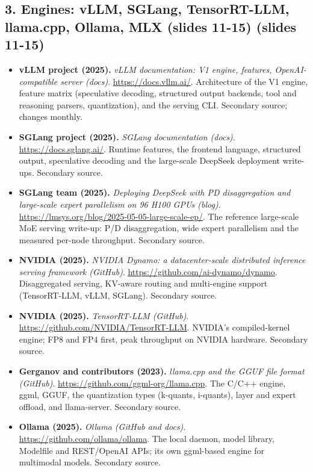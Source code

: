 \documentclass[11pt,letterpaper]{article}
\begin{document}
\subsection*{3. Engines: vLLM, SGLang, TensorRT-LLM, llama.cpp, Ollama, MLX (slides 11-15) (slides 11-15)}
\begin{itemize}[leftmargin=1.2em,itemsep=3pt]\sloppy
\item \textbf{vLLM project (2025).} \textit{vLLM documentation: V1 engine, features, OpenAI-compatible server (docs)}. \url{https://docs.vllm.ai/}. Architecture of the V1 engine, feature matrix (speculative decoding, structured output backends, tool and reasoning parsers, quantization), and the serving CLI. Secondary source; changes monthly.
\item \textbf{SGLang project (2025).} \textit{SGLang documentation (docs)}. \url{https://docs.sglang.ai/}. Runtime features, the frontend language, structured output, speculative decoding and the large-scale DeepSeek deployment write-ups. Secondary source.
\item \textbf{SGLang team (2025).} \textit{Deploying DeepSeek with PD disaggregation and large-scale expert parallelism on 96 H100 GPUs (blog)}. \url{https://lmsys.org/blog/2025-05-05-large-scale-ep/}. The reference large-scale MoE serving write-up: P/D disaggregation, wide expert parallelism and the measured per-node throughput. Secondary source.
\item \textbf{NVIDIA (2025).} \textit{NVIDIA Dynamo: a datacenter-scale distributed inference serving framework (GitHub)}. \url{https://github.com/ai-dynamo/dynamo}. Disaggregated serving, KV-aware routing and multi-engine support (TensorRT-LLM, vLLM, SGLang). Secondary source.
\item \textbf{NVIDIA (2025).} \textit{TensorRT-LLM (GitHub)}. \url{https://github.com/NVIDIA/TensorRT-LLM}. NVIDIA's compiled-kernel engine; FP8 and FP4 first, peak throughput on NVIDIA hardware. Secondary source.
\item \textbf{Gerganov and contributors (2023).} \textit{llama.cpp and the GGUF file format (GitHub)}. \url{https://github.com/ggml-org/llama.cpp}. The C/C++ engine, ggml, GGUF, the quantization types (k-quants, i-quants), layer and expert offload, and llama-server. Secondary source.
\item \textbf{Ollama (2025).} \textit{Ollama (GitHub and docs)}. \url{https://github.com/ollama/ollama}. The local daemon, model library, Modelfile and REST/OpenAI APIs; its own ggml-based engine for multimodal models. Secondary source.

\end{itemize}
\end{document}
